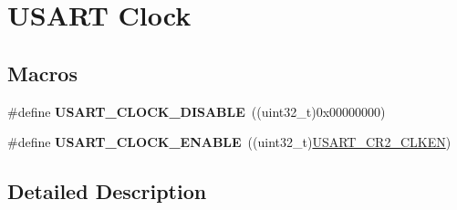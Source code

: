 \hypertarget{group___u_s_a_r_t___clock}{}\section{U\+S\+A\+RT Clock}
\label{group___u_s_a_r_t___clock}
\subsection*{Macros}
\begin{DoxyCompactItemize}
\item 
\#define {\bfseries U\+S\+A\+R\+T\+\_\+\+C\+L\+O\+C\+K\+\_\+\+D\+I\+S\+A\+B\+LE}~((uint32\+\_\+t)0x00000000)\hypertarget{group___u_s_a_r_t___clock_ga7c889a9b9716214fc680eb75ca18c009}{}\label{group___u_s_a_r_t___clock_ga7c889a9b9716214fc680eb75ca18c009}

\item 
\#define {\bfseries U\+S\+A\+R\+T\+\_\+\+C\+L\+O\+C\+K\+\_\+\+E\+N\+A\+B\+LE}~((uint32\+\_\+t)\hyperlink{group___peripheral___registers___bits___definition_ga42a396cde02ffa0c4d3fd9817b6af853}{U\+S\+A\+R\+T\+\_\+\+C\+R2\+\_\+\+C\+L\+K\+EN})\hypertarget{group___u_s_a_r_t___clock_gac055ca6ca9647277e3f89a5df9529730}{}\label{group___u_s_a_r_t___clock_gac055ca6ca9647277e3f89a5df9529730}

\end{DoxyCompactItemize}


\subsection{Detailed Description}
